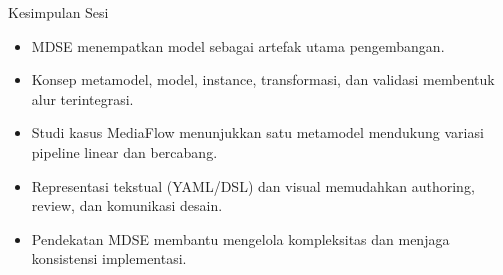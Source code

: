 \documentclass[aspectratio=169, table]{beamer}
\begin{document}
\begin{frame}{Kesimpulan Sesi}
\vspace{6pt}
\begin{itemize}
  \item MDSE menempatkan model sebagai artefak utama pengembangan.
  \item Konsep metamodel, model, instance, transformasi, dan validasi membentuk alur terintegrasi.
  \item Studi kasus MediaFlow menunjukkan satu metamodel mendukung variasi pipeline linear dan bercabang.
  \item Representasi tekstual (YAML/DSL) dan visual memudahkan authoring, review, dan komunikasi desain.
  \item Pendekatan MDSE membantu mengelola kompleksitas dan menjaga konsistensi implementasi.
\end{itemize}
\end{frame}
\end{document}
